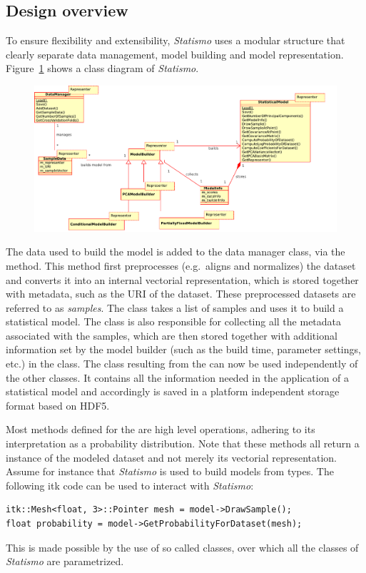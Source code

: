 \documentclass{InsightArticle}
\newcommand{\Statismo}{\emph{Statismo}\xspace}
\begin{document}
\subsection{Design overview}\label{sec:design-overview}
To ensure flexibility and  extensibility, \Statismo uses a modular structure that clearly separate 
data management, model building and model representation. 
Figure~\ref{fig:class-diagram} shows a class diagram of \Statismo.
\begin{figure}
  \includegraphics[width=\textwidth]{pictures/class_diagram.pdf}
  \itkcaption{The core classes in \Statismo}
  \label{fig:class-diagram}
\end{figure}
The data used to build the model is added to the data manager
 class, via the  method. This
method first preprocesses (e.g.\ aligns and normalizes) the dataset
and converts it into an internal vectorial representation, which is
stored together with metadata, such as the URI of the dataset. These
preprocessed datasets are referred to as \emph{samples}. The
 class takes a list of samples and uses it to build
a statistical model. The  class is also responsible
for collecting all the metadata associated with the samples, which are then
stored together with additional information set by the model builder (such as
the build time, parameter settings, etc.) in the 
class. The  class resulting from the
 can now be used independently of the other
classes. It contains all the information needed in the application of
a statistical model and accordingly is saved in a platform independent storage format 
based on HDF5. 

Most methods defined for the
 are high level operations, adhering to its
interpretation as a probability distribution. 
Note that these methods all return a instance of the modeled dataset and not  
merely its vectorial representation. 
Assume for instance that \Statismo is used to build models from  types.
The following itk code can be used to interact with \Statismo:
\begin{verbatim}
itk::Mesh<float, 3>::Pointer mesh = model->DrawSample();
float probability = model->GetProbabilityForDataset(mesh);
\end{verbatim}
This is made possible by the use of so called  classes, over which all the 
classes of \Statismo are parametrized.
\end{document}
